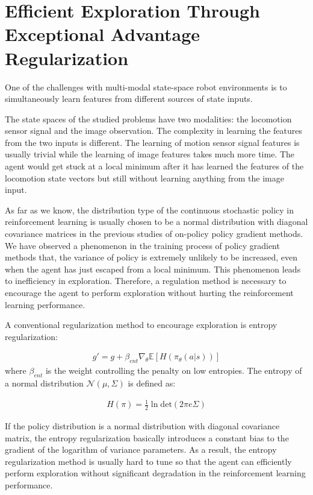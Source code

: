 \section{Efficient Exploration Through Exceptional Advantage Regularization}\label{sec_method_expadv_reg}
One of the challenges with multi-modal state-space robot environments is to simultaneously learn features from different sources of state inputs.

The state spaces of the studied problems have two modalities: the locomotion sensor signal and the image observation. The complexity in learning the features from the two inputs is different. The learning of motion sensor signal features is usually trivial while the learning of image features takes much more time. The agent would get stuck at a local minimum after it has learned the features of the locomotion state vectors but still without learning anything from the image input.

As far as we know, the distribution type of the continuous stochastic policy in reinforcement learning is usually chosen to be a normal distribution with diagonal covariance matrices in the previous studies of on-policy policy gradient methods. We have observed a phenomenon in the training process of policy gradient methods that, the variance of policy is extremely unlikely to be increased, even when the agent has just escaped from a local minimum. This phenomenon leads to inefficiency in exploration. Therefore, a regulation method is necessary to encourage the agent to perform exploration without hurting the reinforcement learning performance.

A conventional regularization method to encourage exploration is entropy regularization:

\begin{align}
g' = g +\beta_{ent}\nabla_\theta \mathbb{E}[ H(\pi_\theta(a|s)) ]
\end{align}
where $\beta_{ent}$ is the weight controlling the penalty on low entropies.
The entropy of a normal distribution $\mathcal{N}(\mu,\Sigma)$ is defined as:

\begin{align}
	H(\pi) =  \frac{1}{2} \ln \mathrm{det}(2\pi e \Sigma)
\end{align}

If the policy distribution is a normal distribution with diagonal covariance matrix, the entropy regularization basically introduces a constant bias to the gradient of the logarithm of variance parameters. As a result, the entropy regularization method is usually hard to tune so that the agent can efficiently perform exploration without significant degradation in the reinforcement learning performance.

